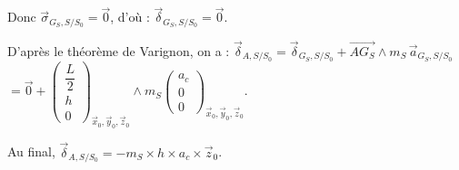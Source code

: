 \begin{corrige}
Donc $\overrightarrow{\sigma}_{G_S, S/S_0} = \vec 0$, d'où :
$ \overrightarrow{\delta}_{G_S, S/S_0} = \vec 0$.


D'après le théorème de Varignon, on a :
$\overrightarrow{\delta}_{A, S/S_0} = \overrightarrow{\delta}_{G_S, S/S_0} + \overrightarrow{AG_S} \wedge m_S \, \overrightarrow{a}_{G_S, S/S_0} $
 $= \vec 0 + \begin{pmatrix}  \dfrac{L}{2} \\ h \\ 0 \end{pmatrix}_{\vec x_0, \vec y_0, \vec z_0} \wedge m_S \begin{pmatrix}  a_c \\ 0 \\ 0 \end{pmatrix}_{\vec x_0, \vec y_0, \vec z_0}$.


Au final, $ \overrightarrow{\delta}_{A, S/S_0} =  - m_S \times h \times a_c \times \vec z_0 $.



\end{corrige}
\else
\fi

